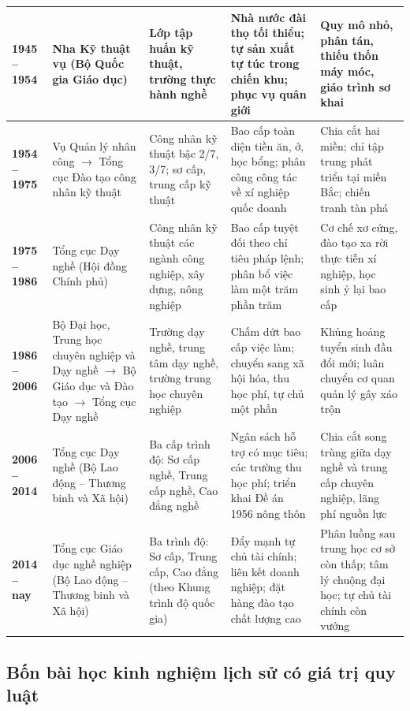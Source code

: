 \begin{small}
\begin{longtable}{|p{2.0cm}|p{2.5cm}|p{2.4cm}|p{3.1cm}|p{2.7cm}|}
\textbf{1945 -- 1954} & Nha Kỹ thuật vụ (Bộ Quốc gia Giáo dục) & Lớp tập huấn kỹ thuật, trường thực hành nghề & Nhà nước đài thọ tối thiểu; tự sản xuất tự túc trong chiến khu; phục vụ quân giới & Quy mô nhỏ, phân tán, thiếu thốn máy móc, giáo trình sơ khai \\
\hline
\textbf{1954 -- 1975} & Vụ Quản lý nhân công $\rightarrow$ Tổng cục Đào tạo công nhân kỹ thuật & Công nhân kỹ thuật bậc 2/7, 3/7; sơ cấp, trung cấp kỹ thuật & Bao cấp toàn diện tiền ăn, ở, học bổng; phân công công tác về xí nghiệp quốc doanh & Chia cắt hai miền; chỉ tập trung phát triển tại miền Bắc; chiến tranh tàn phá \\
\hline
\textbf{1975 -- 1986} & Tổng cục Dạy nghề (Hội đồng Chính phủ) & Công nhân kỹ thuật các ngành công nghiệp, xây dựng, nông nghiệp & Bao cấp tuyệt đối theo chỉ tiêu pháp lệnh; phân bổ việc làm một trăm phần trăm & Cơ chế xơ cứng, đào tạo xa rời thực tiễn xí nghiệp, học sinh ỷ lại bao cấp \\
\hline
\textbf{1986 -- 2006} & Bộ Đại học, Trung học chuyên nghiệp và Dạy nghề $\rightarrow$ Bộ Giáo dục và Đào tạo $\rightarrow$ Tổng cục Dạy nghề & Trường dạy nghề, trung tâm dạy nghề, trường trung học chuyên nghiệp & Chấm dứt bao cấp việc làm; chuyển sang xã hội hóa, thu học phí, tự chủ một phần & Khủng hoảng tuyển sinh đầu đổi mới; luân chuyển cơ quan quản lý gây xáo trộn \\
\hline
\textbf{2006 -- 2014} & Tổng cục Dạy nghề (Bộ Lao động -- Thương binh và Xã hội) & Ba cấp trình độ: Sơ cấp nghề, Trung cấp nghề, Cao đẳng nghề & Ngân sách hỗ trợ có mục tiêu; các trường thu học phí; triển khai Đề án 1956 nông thôn & Chia cắt song trùng giữa dạy nghề và trung cấp chuyên nghiệp, lãng phí nguồn lực \\
\hline
\textbf{2014 -- nay} & Tổng cục Giáo dục nghề nghiệp (Bộ Lao động -- Thương binh và Xã hội) & Ba trình độ: Sơ cấp, Trung cấp, Cao đẳng (theo Khung trình độ quốc gia) & Đẩy mạnh tự chủ tài chính; liên kết doanh nghiệp; đặt hàng đào tạo chất lượng cao & Phân luồng sau trung học cơ sở còn thấp; tâm lý chuộng đại học; tự chủ tài chính còn vướng \\
\hline
\end{longtable}
\end{small}

\subsection{Bốn bài học kinh nghiệm lịch sử có giá trị quy luật}

